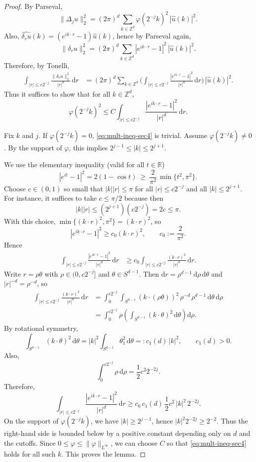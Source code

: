 \documentclass{article}
\numberwithin{equation}{section}
\theoremstyle{plain}
\theoremstyle{definition}
\theoremstyle{remark}
\begin{document}
\begin{proof}
By Parseval,
\[
\|\Delta_j u\|_2^2=(2\pi)^d\sum_{k\in\mathbb{Z}^d}\varphi(2^{-j}k)^2\,|\widehat u(k)|^2.
\]
Also, $\widehat{\delta_r u}(k)=(e^{ik\cdot r}-1)\widehat u(k)$, hence by Parseval again,
\[
\|\delta_r u\|_2^2=(2\pi)^d\sum_{k\in\mathbb{Z}^d}|e^{ik\cdot r}-1|^2\,|\widehat u(k)|^2.
\]
Therefore, by Tonelli,
\begin{align*}
\int_{|r|\le c2^{-j}}\frac{\|\delta_r u\|_2^2}{|r|^d}\,\mathrm{d}r
&=(2\pi)^d\sum_{k\in\mathbb{Z}^d}
\Big(\int_{|r|\le c2^{-j}}\frac{|e^{ik\cdot r}-1|^2}{|r|^d}\,\mathrm{d}r\Big)\,|\widehat u(k)|^2.
\end{align*}
Thus it suffices to show that for all $k\in\mathbb{Z}^d$,
\begin{equation}\label{eq:mult-ineq-sec4}
\varphi(2^{-j}k)^2
\le
C\int_{|r|\le c2^{-j}}\frac{|e^{ik\cdot r}-1|^2}{|r|^d}\,\mathrm{d}r.
\end{equation}

Fix $k$ and $j$. If $\varphi(2^{-j}k)=0$, \eqref{eq:mult-ineq-sec4} is trivial. Assume $\varphi(2^{-j}k)\neq 0$.
By the support of $\varphi$, this implies $2^{j-1}\le |k|\le 2^{j+1}$.

We use the elementary inequality (valid for all $t\in\mathbb{R}$)
\[
|e^{it}-1|^2 = 2(1-\cos t)\ \ge\ \frac{2}{\pi^2}\,\min\{t^2,\pi^2\}.
\]
Choose $c\in(0,1)$ so small that $|k||r|\le \pi$ for all $|r|\le c2^{-j}$ and all $|k|\le 2^{j+1}$.
For instance, it suffices to take $c\le \pi/2$ because then
\[
|k||r|\le (2^{j+1})(c2^{-j}) = 2c \le \pi.
\]
With this choice, $\min\{(k\cdot r)^2,\pi^2\}=(k\cdot r)^2$, so
\[
|e^{ik\cdot r}-1|^2 \ge c_0 (k\cdot r)^2,
\qquad c_0:=\frac{2}{\pi^2}.
\]
Hence
\begin{align*}
\int_{|r|\le c2^{-j}}\frac{|e^{ik\cdot r}-1|^2}{|r|^d}\,\mathrm{d}r
&\ge c_0\int_{|r|\le c2^{-j}}\frac{(k\cdot r)^2}{|r|^d}\,\mathrm{d}r.
\end{align*}
Write $r=\rho\theta$ with $\rho\in(0,c2^{-j}]$ and $\theta\in S^{d-1}$.
Then $\mathrm{d}r=\rho^{d-1}\,\mathrm{d}\rho\,\mathrm{d}\theta$ and $|r|^{-d}=\rho^{-d}$, so
\begin{align*}
\int_{|r|\le c2^{-j}}\frac{(k\cdot r)^2}{|r|^d}\,\mathrm{d}r
&=\int_0^{c2^{-j}}\int_{S^{d-1}} (k\cdot(\rho\theta))^2\,\rho^{-d}\,\rho^{d-1}\,\mathrm{d}\theta\,\mathrm{d}\rho \\
&=\int_0^{c2^{-j}}\rho\left(\int_{S^{d-1}}(k\cdot\theta)^2\,\mathrm{d}\theta\right)\mathrm{d}\rho.
\end{align*}
By rotational symmetry,
\[
\int_{S^{d-1}}(k\cdot\theta)^2\,\mathrm{d}\theta
=|k|^2\int_{S^{d-1}}\theta_1^2\,\mathrm{d}\theta
=:c_1(d)\,|k|^2,
\qquad c_1(d)>0.
\]
Also,
\[
\int_0^{c2^{-j}}\rho\,\mathrm{d}\rho = \frac12 c^2 2^{-2j}.
\]
Therefore,
\[
\int_{|r|\le c2^{-j}}\frac{|e^{ik\cdot r}-1|^2}{|r|^d}\,\mathrm{d}r
\ge c_0\,c_1(d)\,\frac12 c^2\,|k|^2\,2^{-2j}.
\]
On the support of $\varphi(2^{-j}k)$, we have $|k|\ge 2^{j-1}$, hence $|k|^2 2^{-2j}\ge 2^{-2}$.
Thus the right-hand side is bounded below by a positive constant depending only on $d$ and the cutoffs.
Since $0\le \varphi\le \|\varphi\|_{L^\infty}$, we can choose $C$ so that
\eqref{eq:mult-ineq-sec4} holds for all such $k$. This proves the lemma.
\end{proof}
\end{document}
